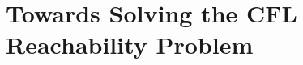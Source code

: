 \documentclass[12pt, letterpaper]{report}   %
\begin{document}
\section{Towards Solving the CFL Reachability Problem}
\label{ch:furthers}



\cleardoublepage


\nocite{tikzDevice,plotly,reshape,Rcomputing,Florida2000}




\appendix
\begingroup
  \hypersetup{linkbordercolor=white,linkcolor=black,
    filecolor=black, urlcolor=black} 
\listofappendixfigures
\endgroup





% 

\end{document}
